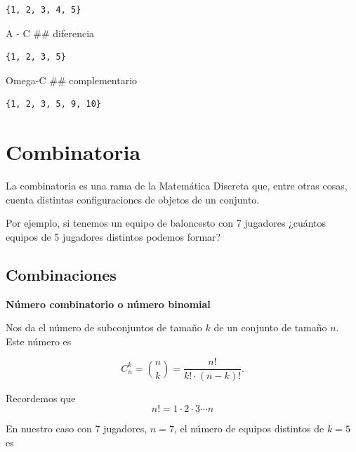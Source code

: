 \documentclass[
  letterpaper,
  DIV=11,
  numbers=noendperiod]{scrreprt}
\newenvironment{Shaded}{\begin{snugshade}}{\end{snugshade}}
\newcommand{\CommentTok}[1]{\textcolor[rgb]{0.37,0.37,0.37}{#1}}
\newcommand{\NormalTok}[1]{\textcolor[rgb]{0.00,0.23,0.31}{#1}}
\newcommand{\OperatorTok}[1]{\textcolor[rgb]{0.37,0.37,0.37}{#1}}
\begin{document}
\begin{verbatim}
{1, 2, 3, 4, 5}
\end{verbatim}

\begin{Shaded}
\begin{Highlighting}[]
\NormalTok{A }\OperatorTok{{-}}\NormalTok{ C   }\CommentTok{\#\# diferencia }
\end{Highlighting}
\end{Shaded}

\begin{verbatim}
{1, 2, 3, 5}
\end{verbatim}

\begin{Shaded}
\begin{Highlighting}[]
\NormalTok{Omega}\OperatorTok{{-}}\NormalTok{C }\CommentTok{\#\# complementario}
\end{Highlighting}
\end{Shaded}

\begin{verbatim}
{1, 2, 3, 5, 9, 10}
\end{verbatim}

\hypertarget{combinatoria}{%
\section{Combinatoria}\label{combinatoria}}

La combinatoria es una rama de la Matemática Discreta que, entre otras
cosas, cuenta distintas configuraciones de objetos de un conjunto.

Por ejemplo, si tenemos un equipo de baloncesto con 7 jugadores ¿cuántos
equipos de 5 jugadores distintos podemos formar?

\hypertarget{combinaciones}{%
\subsection{Combinaciones}\label{combinaciones}}

\textbf{Número combinatorio o número binomial}

Nos da el número de subconjuntos de tamaño \(k\) de un conjunto de
tamaño \(n\). Este número es

\[
C_n^k={n\choose k} = \frac{n!}{k!\cdot (n-k)!}.
\]

Recordemos que \[
n!=1\cdot 2\cdot 3\cdots n
\]

En nuestro caso con 7 jugadores, \(n=7\), el número de equipos distintos
de \(k=5\) es
\end{document}
